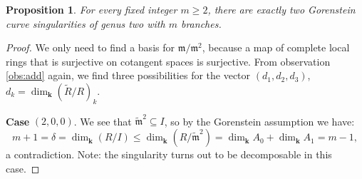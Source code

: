 \documentclass[11pt]{amsart}
\renewcommand{\k}{\mathbf k}
\newcommand{\m}{\mathfrak m}
\newcommand{\tR}{\widetilde{R}}
\newcommand{\tm}{\widetilde{\mathfrak m}}
\theoremstyle{plain}
\newtheorem{prop}[thm]{Proposition}
\theoremstyle{definition}
\begin{document}
\begin{prop}\label{prop:classification}
 For every fixed integer $m\geq 2$, there are exactly two Gorenstein curve singularities of genus two with $m$ branches.
\end{prop}
\begin{proof}
 We only need to find a basis for $\m/\m^2$, because a map of complete local rings that is surjective on cotangent spaces is surjective. From observation \eqref{obs:add} again, we find three possibilities for the vector $(d_1,d_2,d_3)$, $d_k=\dim_{\k}(\tR/R)_k$.
 
 \smallskip
 
 \textbf{Case} $(2,0,0)$. We see that $\tm^2\subseteq I$, so by the Gorenstein assumption we have: \[m+1=\delta=\dim_\k(R/I)\leq \dim_\k(R/\tm^2)=\dim_\k A_0+\dim_\k A_1=m-1,\] a contradiction. Note: the singularity turns out to be decomposable in this case.
 
 \smallskip
 

\end{proof}
\end{document}
